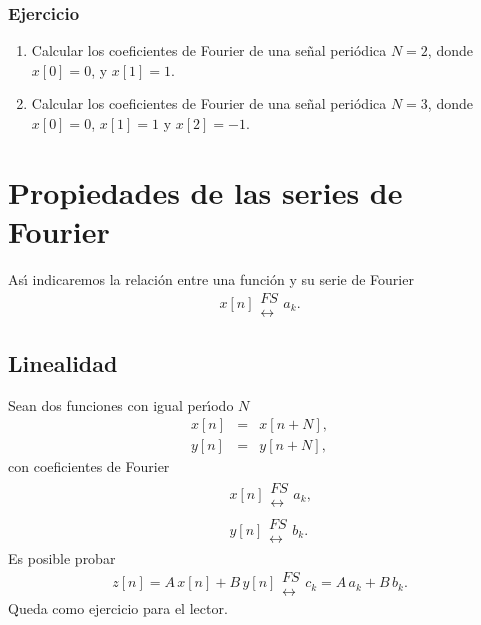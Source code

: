 \subsubsection{Ejercicio}

\begin{enumerate}
\item Calcular los coeficientes de Fourier de una se\~{n}al peri\'{o}dica $N = 2$, donde $x[0] = 0$, y $x[1] = 1$.

\item Calcular los coeficientes de Fourier de una se\~{n}al peri\'{o}dica $N = 3$, donde $x[0] = 0$, $x[1] = 1$ y $x[2] = -1$.
\end{enumerate}

\section{Propiedades de las series de Fourier}

As\'{\i} indicaremos la relaci\'{o}n entre una funci\'{o}n y su serie de
Fourier 
\begin{equation}
x\left[ n\right] 
\begin{array}{l}
FS \\ 
\longleftrightarrow
\end{array}
a_{k}.
\end{equation}

\subsection{Linealidad}

Sean dos funciones con igual per\'{\i}odo $N$
\begin{eqnarray}
x\left[ n\right] &=&x\left[ n+N\right] , \\
y\left[ n\right] &=&y\left[ n+N\right] ,
\end{eqnarray}
con coeficientes de Fourier
\begin{eqnarray}
&&x\left[ n\right] 
\begin{array}{l}
FS \\ 
\longleftrightarrow
\end{array}
a_{k}, \\
&&y\left[ n\right] 
\begin{array}{l}
FS \\ 
\longleftrightarrow
\end{array}
b_{k}.
\end{eqnarray}
Es posible probar
\begin{equation}
z\left[ n\right] = A \, x\left[ n\right] +B \, y\left[ n\right] 
\begin{array}{l}
FS \\ 
\longleftrightarrow
\end{array}
c_{k}=A \, a_{k}+B \, b_{k}.
\end{equation}
Queda como ejercicio para el lector.

